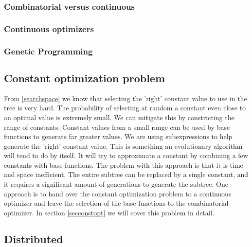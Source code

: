 \subsubsection{Combinatorial versus continuous}

\subsubsection{Continuous optimizers}

\subsubsection{Genetic Programming}

\subsection{Constant optimization problem}
From \ref{searchspace} we know that selecting the 'right' constant value to use in the tree is very hard. The probability of selecting at random a constant even close to an optimal value is extremely small. We can mitigate this by constricting the range of constants. Constant values from a small range can be used by base functions to generate far greater values. We are using subexpressions to help generate the 'right' constant value. This is something an evolutionary algorithm will tend to do by itself. It will try to approximate a constant by combining a few constants with base functions. The problem with this approach is that it is time and space inefficient. The entire subtree can be replaced by a single constant, and it requires a significant amount of generations to generate the subtree. One approach is to hand over the constant optimization problem to a continuous optimizer and leave the selection of the base functions to the combinatorial optimizer. In section \ref{secconstopt} we will cover this problem in detail.

\subsection{Distributed}
